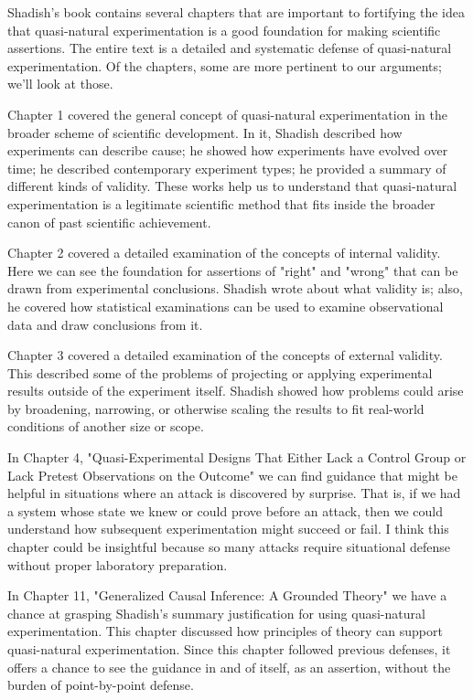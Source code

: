 Shadish's book contains several chapters that are important to fortifying the idea that quasi-natural experimentation is a good foundation for making scientific assertions.  The entire text is a detailed and systematic defense of quasi-natural experimentation.  Of the chapters, some are more pertinent to our arguments; we'll look at those.

Chapter 1 covered the general concept of quasi-natural experimentation in the broader scheme of scientific development.  In it, Shadish described how experiments can describe cause; he showed how experiments have evolved over time; he described contemporary experiment types; he provided a summary of different kinds of validity.  These works help us to understand that quasi-natural experimentation is a legitimate scientific method that fits inside the broader canon of past scientific achievement.

Chapter 2 covered a detailed examination of the concepts of internal validity.  Here we can see the foundation for assertions of "right" and "wrong" that can be drawn from experimental conclusions.  Shadish wrote about what validity is; also, he covered how statistical examinations can be used to examine observational data and draw conclusions from it.

Chapter 3 covered a detailed examination of the concepts of external validity.  This described some of the problems of projecting or applying experimental results outside of the experiment itself.  Shadish showed how problems could arise by broadening, narrowing, or otherwise scaling the results to fit real-world conditions of another size or scope.

In Chapter 4, "Quasi-Experimental Designs That Either Lack a Control Group or Lack Pretest Observations on the Outcome" we can find guidance that might be helpful in situations where an \gls{attack} is discovered by surprise.  That is, if we had a system whose state we knew or could prove before an \gls{attack}, then we could understand how subsequent experimentation might succeed or fail.  I think this chapter could be insightful because so many attacks require situational defense without proper laboratory preparation.

In Chapter 11, "Generalized Causal Inference:  A Grounded Theory" we have a chance at grasping Shadish's summary justification for using quasi-natural experimentation.  This chapter discussed how principles of theory can support quasi-natural experimentation.  Since this chapter followed previous defenses, it offers a chance to see the guidance in and of itself, as an assertion, without the burden of point-by-point defense.

